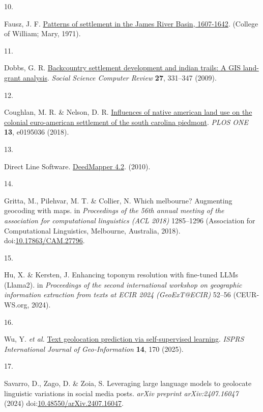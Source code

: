 \documentclass[
  10pt]{article}
\newlength{\cslhangindent}
\newlength{\csllabelwidth}
\newenvironment{CSLReferences}[2] %
 {\begin{list}{}{%
  \setlength{\itemindent}{0pt}
  \setlength{\leftmargin}{0pt}
  \setlength{\parsep}{0pt}
  \ifodd #1
   \setlength{\leftmargin}{\cslhangindent}
   \setlength{\itemindent}{-1\cslhangindent}
  \fi
  \setlength{\itemsep}{#2\baselineskip}}}
 {\end{list}}
\newcommand{\CSLLeftMargin}[1]{\parbox[t]{\csllabelwidth}{\strut#1\strut}}
\newcommand{\CSLRightInline}[1]{\parbox[t]{\linewidth - \csllabelwidth}{\strut#1\strut}}
\begin{document}
\begin{CSLReferences}{0}{0}
\CSLLeftMargin{10. }%
\CSLRightInline{Fausz, J. F.
\href{https://dx.doi.org/doi:10.21220/s2-jedw-z031}{Patterns of
settlement in the {James} {River} {Basin}, 1607-1642}. (College of
William; Mary, 1971).}

\CSLLeftMargin{11. }%
\CSLRightInline{Dobbs, G. R.
\href{https://doi.org/10.1177/0894439308329760}{Backcountry settlement
development and indian trails: A GIS land-grant analysis}. \emph{Social
Science Computer Review} \textbf{27}, 331--347 (2009).}

\CSLLeftMargin{12. }%
\CSLRightInline{Coughlan, M. R. \& Nelson, D. R.
\href{https://doi.org/10.1371/journal.pone.0195036}{Influences of native
american land use on the colonial euro-american settlement of the south
carolina piedmont}. \emph{PLOS ONE} \textbf{13}, e0195036 (2018).}

\CSLLeftMargin{13. }%
\CSLRightInline{Direct Line Software.
\href{https://directlinesoftware.com/deeds/}{DeedMapper 4.2}. (2010).}

\CSLLeftMargin{14. }%
\CSLRightInline{Gritta, M., Pilehvar, M. T. \& Collier, N. Which
melbourne? Augmenting geocoding with maps. in \emph{Proceedings of the
56th annual meeting of the association for computational linguistics
(ACL 2018)} 1285--1296 (Association for Computational Linguistics,
Melbourne, Australia, 2018).
doi:\href{https://doi.org/10.17863/CAM.27796}{10.17863/CAM.27796}.}

\CSLLeftMargin{15. }%
\CSLRightInline{Hu, X. \& Kersten, J. Enhancing toponym resolution with
fine-tuned {LLMs} ({Llama2}). in \emph{Proceedings of the second
international workshop on geographic information extraction from texts
at ECIR 2024 (GeoExT@ECIR)} 52--56 (CEUR-WS.org, 2024).}

\CSLLeftMargin{16. }%
\CSLRightInline{Wu, Y. \emph{et al.}
\href{https://doi.org/10.3390/ijgi14040170}{Text geolocation prediction
via self-supervised learning}. \emph{ISPRS International Journal of
Geo‐Information} \textbf{14}, 170 (2025).}

\CSLLeftMargin{17. }%
\CSLRightInline{Savarro, D., Zago, D. \& Zoia, S. Leveraging large
language models to geolocate linguistic variations in social media
posts. \emph{arXiv preprint arXiv:2407.16047} (2024)
doi:\href{https://doi.org/10.48550/arXiv.2407.16047}{10.48550/arXiv.2407.16047}.}


\end{CSLReferences}
\end{document}
